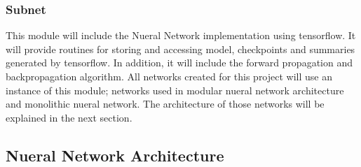 \documentclass[12pt,a4paper]{article}
\begin{document}
\subsubsection{Subnet}
This module will include the Nueral Network implementation using tensorflow. It will provide routines for storing and accessing model, checkpoints and summaries generated by tensorflow. In addition, it will include the forward propagation and backpropagation algorithm. All networks created for this project will use an instance of this module; networks used in modular nueral network architecture and monolithic nueral network. The architecture of those networks will be explained in the next section.

\subsection{Nueral Network Architecture} \label{modnet}
\end{document}
